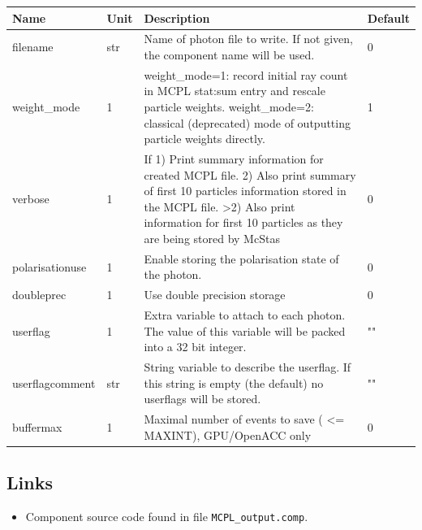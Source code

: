 \begin{longtable}{p{}p{}p{}p{}}
\toprule
\textbf{Name} & \textbf{Unit} & \textbf{Description} & \textbf{Default} \\
\midrule
\endhead
filename & str & Name of photon file to write. If not given, the component name will be used. & 0 \\
weight\_mode & 1 & weight\_mode=1: record initial ray count in MCPL stat:sum entry and rescale particle weights. weight\_mode=2: classical (deprecated) mode of outputting particle weights directly. & 1 \\
verbose & 1 & If 1) Print summary information for created MCPL file. 2) Also print summary of first 10 particles information stored in the MCPL file. \textgreater{}2) Also print information for first 10 particles as they are being stored by McStas & 0 \\
polarisationuse & 1 & Enable storing the polarisation state of the photon. & 0 \\
doubleprec & 1 & Use double precision storage & 0 \\
userflag & 1 & Extra variable to attach to each photon. The value of this variable will be packed into a 32 bit integer. & "" \\
userflagcomment & str & String variable to describe the userflag. If this string is empty (the default) no userflags will be stored. & "" \\
buffermax & 1 & Maximal number of events to save ( \textless{}= MAXINT), GPU/OpenACC only & 0 \\
\bottomrule
\end{longtable}

\subsection*{Links}
\begin{itemize}
  \item Component source code found in file \texttt{MCPL\_output.comp}.
\end{itemize}
